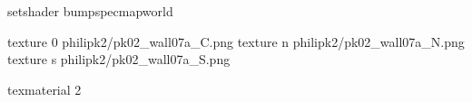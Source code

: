 setshader bumpspecmapworld

texture 0 philipk2/pk02_wall07a_C.png
texture n philipk2/pk02_wall07a_N.png
texture s philipk2/pk02_wall07a_S.png

texmaterial 2
